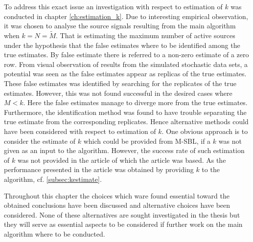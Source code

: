 To address this exact issue an investigation with respect to estimation of $k$ was conducted in chapter \ref{ch:estimation_k}. 
Due to interesting empirical observation, it was chosen to analyse the source signals resulting from the main algorithm when $k = N = \widetilde{M}$. 
That is estimating the maximum number of active sources under the hypothesis that the false estimates where to be identified among the true estimates. By false estimate there is referred to a non-zero estimate of a zero row. 
From visual observation of results from the simulated stochastic data sets, a potential was seen as the false estimates appear as replicas of the true estimates. 
These false estimates was identified by searching for the replicates of the true estimates.
However, this was not found successful in the desired cases where $M < k$. 
Here the false estimates manage to diverge more from the true estimates. 
Furthermore, the identification method was found to have trouble separating the true estimate from the corresponding replicates.
Hence alternative methods could have been considered with respect to estimation of $k$. 
One obvious approach is to consider the estimate of $k$ which could be provided from M-SBL, if a $k$ was not given as an input to the algorithm. 
However, the success rate of such estimation of $k$ was not provided in the article \cite{Balkan2014} of which the article was based. As the performance presented in the article was obtained by providing $k$ to the algorithm, cf. \ref{subsec:kestimate}.   

Throughout this chapter the choices which ware found essential toward the obtained conclusions have been discussed and alternative choices have been considered. 
None of these alternatives are sought investigated in the thesis but they will serve as essential aspects to be considered if further work on the main algorithm where to be conducted. 